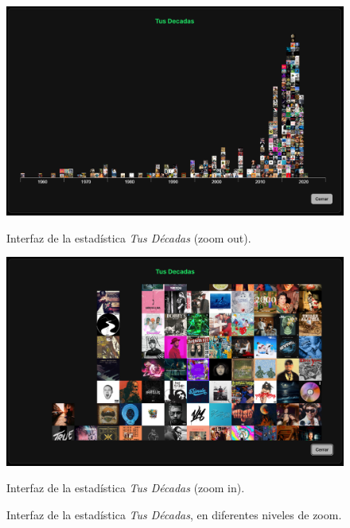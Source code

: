 \begin{figure}[H]
  \centering
  \vspace{-10pt}
  \begin{minipage}{0.47\textwidth}
    \centering
    \includegraphics[width=\textwidth]{figures/capturas_ui/tus_decadas_out.png}
    \caption{Interfaz de la estadística \textit{Tus Décadas} (zoom out).}
    \label{fig:tus_decadas_out}
  \end{minipage}
  \begin{minipage}{0.47\textwidth}
    \centering
    \includegraphics[width=\textwidth]{figures/capturas_ui/tus_decadas_zoom.png}
    \caption{Interfaz de la estadística \textit{Tus Décadas} (zoom in).}
    \label{fig:tus_decadas_zoom}
  \end{minipage}
  \caption{Interfaz de la estadística \textit{Tus Décadas}, en diferentes niveles de zoom.}
  \label{fig:tus_decadas}
\end{figure}

